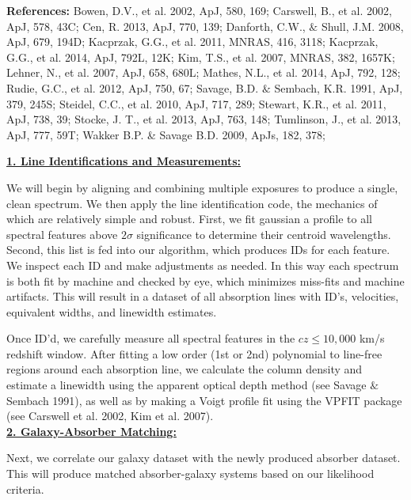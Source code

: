 \documentclass[12pt]{article}
\begin{document}
\noindent \textbf{References: } Bowen, D.V., et al. 2002, ApJ, 580, 169; Carswell, B., et al. 2002, ApJ, 578, 43C; Cen, R. 2013, ApJ, 770, 139; Danforth, C.W., $\&$ Shull, J.M. 2008, ApJ, 679, 194D; Kacprzak, G.G., et al. 2011, MNRAS, 416, 3118; Kacprzak, G.G., et al. 2014, ApJ, 792L, 12K; Kim, T.S., et al. 2007, MNRAS, 382, 1657K; Lehner, N., et al. 2007, ApJ, 658, 680L; Mathes, N.L., et al. 2014, ApJ, 792, 128; Rudie, G.C., et al. 2012, ApJ,  750, 67; Savage, B.D. $\&$ Sembach, K.R. 1991, ApJ, 379, 245S; Steidel, C.C., et al. 2010, ApJ, 717, 289; Stewart, K.R., et al. 2011, ApJ, 738, 39; Stocke, J. T., et al. 2013, ApJ, 763, 148; Tumlinson, J., et al. 2013, ApJ, 777, 59T; Wakker B.P. \& Savage B.D. 2009, ApJs, 182, 378; 

%
%
\describearchival       %

\noindent \textbf{\underline{1. Line Identifications and Measurements:}}

We will begin by aligning and combining multiple exposures to produce a single, clean spectrum. We then apply the line identification code, the mechanics of which are relatively simple and robust. First, we fit gaussian a profile to all spectral features above $2\sigma$ significance to determine their centroid wavelengths. Second, this list is fed into our algorithm, which produces IDs for each feature. We inspect each ID and make adjustments as needed. In this way each spectrum is both fit by machine and checked by eye, which minimizes miss-fits and machine artifacts. This will result in a dataset of all absorption lines with ID's, velocities, equivalent widths, and linewidth estimates.

Once ID'd, we carefully measure all spectral features in the $cz\le 10,000$ km/s redshift window. After fitting a low order (1st or 2nd) polynomial to line-free regions around each absorption line, we calculate the column density and estimate a linewidth using the apparent optical depth method (see Savage $\&$ Sembach 1991), as well as by making a Voigt profile fit using the VPFIT package (see Carswell et al. 2002, Kim et al. 2007).\\

\noindent \textbf{\underline{2. Galaxy-Absorber Matching:}}

Next, we correlate our galaxy dataset with the newly produced absorber dataset. This will produce matched absorber-galaxy systems based on our likelihood criteria. 
\end{document}

